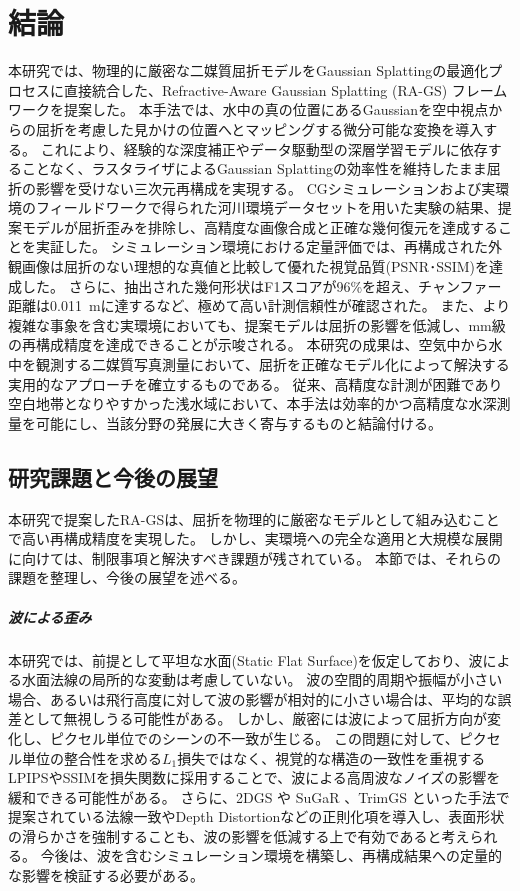 \newpage
\chapter{結論}\label{chap:conclusion}

本研究では、物理的に厳密な二媒質屈折モデルをGaussian Splattingの最適化プロセスに直接統合した、Refractive-Aware Gaussian Splatting (RA-GS) フレームワークを提案した。
本手法では、水中の真の位置にあるGaussianを空中視点からの屈折を考慮した見かけの位置へとマッピングする微分可能な変換を導入する。
これにより、経験的な深度補正やデータ駆動型の深層学習モデルに依存することなく、ラスタライザによるGaussian Splattingの効率性を維持したまま屈折の影響を受けない三次元再構成を実現する。
CGシミュレーションおよび実環境のフィールドワークで得られた河川環境データセットを用いた実験の結果、提案モデルが屈折歪みを排除し、高精度な画像合成と正確な幾何復元を達成することを実証した。
シミュレーション環境における定量評価では、再構成された外観画像は屈折のない理想的な真値と比較して優れた視覚品質(PSNR･SSIM)を達成した。
さらに、抽出された幾何形状はF1スコアが96\%を超え、チャンファー距離は0.011~mに達するなど、極めて高い計測信頼性が確認された。
また、より複雑な事象を含む実環境においても、提案モデルは屈折の影響を低減し、mm級の再構成精度を達成できることが示唆される。
本研究の成果は、空気中から水中を観測する二媒質写真測量において、屈折を正確なモデル化によって解決する実用的なアプローチを確立するものである。
従来、高精度な計測が困難であり空白地帯となりやすかった浅水域において、本手法は効率的かつ高精度な水深測量を可能にし、当該分野の発展に大きく寄与するものと結論付ける。

\section{研究課題と今後の展望}\label{sec:limitation}
本研究で提案したRA-GSは、屈折を物理的に厳密なモデルとして組み込むことで高い再構成精度を実現した。
しかし、実環境への完全な適用と大規模な展開に向けては、制限事項と解決すべき課題が残されている。
本節では、それらの課題を整理し、今後の展望を述べる。

\paragraph{波による歪み}\label{subsec:wave-distortion}

本研究では、前提として平坦な水面(Static Flat Surface)を仮定しており、波による水面法線の局所的な変動は考慮していない。
波の空間的周期や振幅が小さい場合、あるいは飛行高度に対して波の影響が相対的に小さい場合は、平均的な誤差として無視しうる可能性がある。
しかし、厳密には波によって屈折方向が変化し、ピクセル単位でのシーンの不一致が生じる。
この問題に対して、ピクセル単位の整合性を求める$L_1$損失ではなく、視覚的な構造の一致性を重視するLPIPSやSSIMを損失関数に採用することで、波による高周波なノイズの影響を緩和できる可能性がある。
さらに、2DGS \cite{Huang2024SIGGRAPH_2DGS} や SuGaR \cite{Gu2024CVPR_SuGaR}、TrimGS \cite{fan2024_trimGS} といった手法で提案されている法線一致やDepth Distortionなどの正則化項を導入し、表面形状の滑らかさを強制することも、波の影響を低減する上で有効であると考えられる。
今後は、波を含むシミュレーション環境を構築し、再構成結果への定量的な影響を検証する必要がある。

